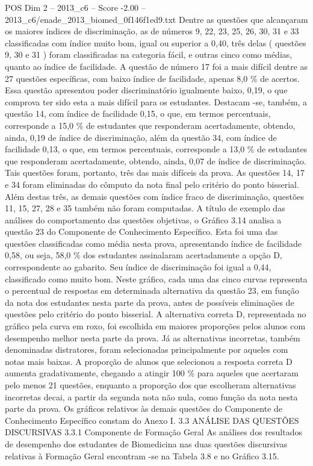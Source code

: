 \begin{textsample}{POS Dim 2 – 2013\_c6 – Score -2.00 – 2013\_c6/enade\_2013\_biomed\_0f146f1ed9.txt}
Dentre as questões que alcançaram os maiores índices de discriminação, as de números 9, 22, 23, 25, 26, 30, 31 e 33 classificadas com índice muito bom, igual ou superior a 0,40, três delas ( questões 9, 30 e 31 ) foram classificadas na categoria fácil, e outras cinco como médias, quanto ao índice de facilidade.
A questão de número 17 foi a mais difícil dentre as 27 questões específicas, com baixo índice de facilidade, apenas 8,0 \% de acertos.
Essa questão apresentou poder discriminatório igualmente baixo, 0,19, o que comprova ter sido esta a mais difícil para os estudantes.
Destacam -se, também, a questão 14, com índice de facilidade 0,15, o que, em termos percentuais, corresponde a 15,0 \% de estudantes que responderam acertadamente, obtendo, ainda, 0,19 de índice de discriminação, além da questão 34, com índice de facilidade 0,13, o que, em termos percentuais, corresponde a 13,0 \% de estudantes que responderam acertadamente, obtendo, ainda, 0,07 de índice de discriminação.
Tais questões foram, portanto, três das mais difíceis da prova.
As questões 14, 17 e 34 foram eliminadas do cômputo da nota final pelo critério do ponto bisserial.
Além destas três, as demais questões com índice fraco de discriminação, questões 11, 15, 27, 28 e 35 também não foram computadas.
A título de exemplo das análises do comportamento das questões objetivas, o Gráfico 3.14 analisa a questão 23 do Componente de Conhecimento Específico.
Esta foi uma das questões classificadas como média nesta prova, apresentando índice de facilidade 0,58, ou seja, 58,0 \% dos estudantes assinalaram acertadamente a opção D, correspondente ao gabarito.
Seu índice de discriminação foi igual a 0,44, classificado como muito bom.
Neste gráfico, cada uma das cinco curvas representa o percentual de respostas em determinada alternativa da questão 23, em função da nota dos estudantes nesta parte da prova, antes de possíveis eliminações de questões pelo critério do ponto bisserial.
A alternativa correta D, representada no gráfico pela curva em roxo, foi escolhida em maiores proporções pelos alunos com desempenho melhor nesta parte da prova.
Já as alternativas incorretas, também denominadas distratores, foram selecionadas principalmente por aqueles com notas mais baixas.
A proporção de alunos que selecionou a resposta correta D aumenta gradativamente, chegando a atingir 100 \% para aqueles que acertaram pelo menos 21 questões, enquanto a proporção dos que escolheram alternativas incorretas decai, a partir da segunda nota não nula, como função da nota nesta parte da prova.
Os gráficos relativos às demais questões do Componente de Conhecimento Específico constam do Anexo I. 3.3 ANÁLISE DAS QUESTÕES DISCURSIVAS 3.3.1 Componente de Formação Geral As análises dos resultados de desempenho dos estudantes de Biomedicina nas duas questões discursivas relativas à Formação Geral encontram -se na Tabela 3.8 e no Gráfico 3.15.

\end{textsample}
